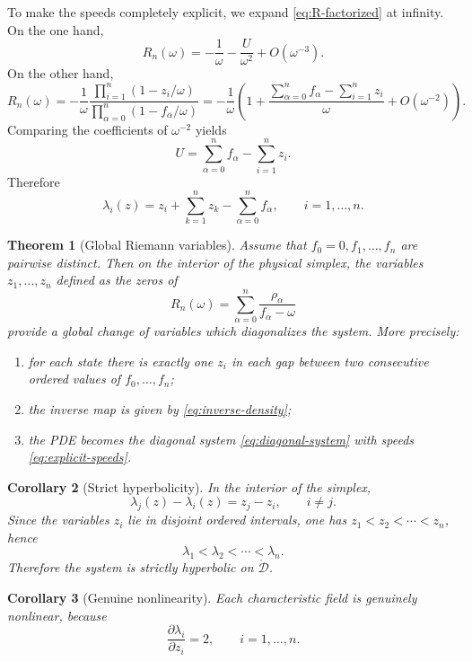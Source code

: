 \documentclass[12pt]{article}
\newtheorem{theorem}{Theorem}
\newtheorem{corollary}[theorem]{Corollary}
\begin{document}
To make the speeds completely explicit, we expand \eqref{eq:R-factorized} at infinity. On the one hand,
\[
R_n(\omega) = -\frac{1}{\omega} - \frac{U}{\omega^2}+O(\omega^{-3}).
\]
On the other hand,
\[
R_n(\omega)
=
-\frac{1}{\omega}
\frac{\prod_{i=1}^n (1-z_i/\omega)}{\prod_{\alpha=0}^n (1-f_\alpha/\omega)}
=
-\frac{1}{\omega}
\left(1+\frac{\sum_{\alpha=0}^n f_\alpha-\sum_{i=1}^n z_i}{\omega}+O(\omega^{-2})\right).
\]
Comparing the coefficients of $\omega^{-2}$ yields
\begin{equation}
U = \sum_{\alpha=0}^n f_\alpha - \sum_{i=1}^n z_i.
\label{eq:U-in-r}
\end{equation}
Therefore
\begin{equation}
\lambda_i(z)
=
z_i + \sum_{k=1}^n z_k - \sum_{\alpha=0}^n f_\alpha,
\qquad i=1,\dots,n.
\label{eq:explicit-speeds}
\end{equation}

\begin{theorem}[Global Riemann variables]
\label{thm:global-riemann-variables}
Assume that $f_0=0,f_1,\dots,f_n$ are pairwise distinct. Then on the interior of the physical simplex, the variables $z_1,\dots,z_n$ defined as the zeros of
\[
R_n(\omega)=\sum_{\alpha=0}^n \frac{\rho_\alpha}{f_\alpha-\omega}
\]
provide a global change of variables which diagonalizes the system. More precisely:
\begin{enumerate}[label=\textup{(\roman*)}]
\item for each state there is exactly one $z_i$ in each gap between two consecutive ordered values of $f_0,\dots,f_n$;
\item the inverse map is given by \eqref{eq:inverse-density};
\item the PDE becomes the diagonal system \eqref{eq:diagonal-system} with speeds \eqref{eq:explicit-speeds}.
\end{enumerate}
\end{theorem}

\begin{corollary}[Strict hyperbolicity]
In the interior of the simplex,
\[
\lambda_j(z)-\lambda_i(z)=z_j-z_i,
\qquad i\ne j.
\]
Since the variables $z_i$ lie in disjoint ordered intervals, one has $z_1<z_2<\cdots<z_n$, hence
\[
\lambda_1<\lambda_2<\cdots<\lambda_n.
\]
Therefore the system is strictly hyperbolic on $\mathring{\mathcal D}$.
\end{corollary}

\begin{corollary}[Genuine nonlinearity]
Each characteristic field is genuinely nonlinear, because
\[
\frac{\partial \lambda_i}{\partial z_i}=2,
\qquad i=1,\dots,n.
\]
\end{corollary}
\end{document}
